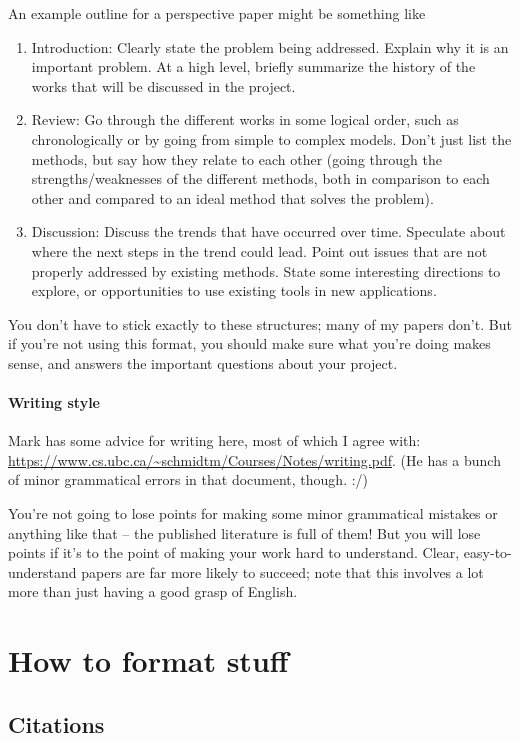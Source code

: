 \documentclass{article}
\begin{document}
An example outline for a perspective paper might be something like
\begin{enumerate}
\item Introduction: Clearly state the problem being addressed. Explain why it is an important problem. At a high level, briefly summarize the history of the works that will be discussed in the project.
\item Review: Go through the different works in some logical order, such as chronologically or by going from simple to complex models. Don't just list the methods, but say how they relate to each other (going through the strengths/weaknesses of the different methods, both in comparison to each other and compared to an ideal method that solves the problem).
\item Discussion: Discuss the trends that have occurred over time. Speculate about where the next steps in the trend could lead. Point out issues that are not properly addressed by existing methods. State some interesting directions to explore, or opportunities to use existing tools in new applications.
\end{enumerate}

You don't have to stick exactly to these structures; many of my papers don't.
But if you're not using this format, you should make sure what you're doing makes sense,
and answers the important questions about your project.

\paragraph{Writing style}
Mark has some advice for writing here, most of which I agree with:
\url{https://www.cs.ubc.ca/~schmidtm/Courses/Notes/writing.pdf}.
(He has a bunch of minor grammatical errors in that document, though. :/)

You're not going to lose points for making some minor grammatical mistakes or anything like that
-- the published literature is full of them!
But you will lose points if it's to the point of making your work hard to understand.
Clear, easy-to-understand papers are far more likely to succeed;
note that this involves a lot more than just having a good grasp of English.


\section{How to format stuff}
\subsection{Citations}
\end{document}
